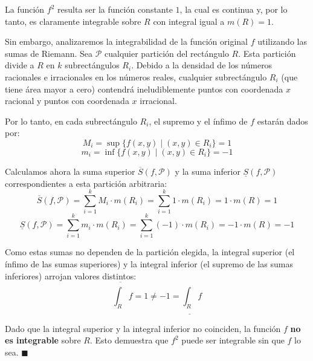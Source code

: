 \documentclass[11pt,letterpaper]{article}
\begin{document}
La función $f^2$ resulta ser la función constante $1$, la cual es continua y, por lo tanto, es claramente integrable sobre $R$ con integral igual a $m(R) = 1$. 

Sin embargo, analizaremos la integrabilidad de la función original $f$ utilizando las sumas de Riemann. Sea $\mathcal{P}$ cualquier partición del rectángulo $R$. Esta partición divide a $R$ en $k$ subrectángulos $R_i$. Debido a la densidad de los números racionales e irracionales en los números reales, cualquier subrectángulo $R_i$ (que tiene área mayor a cero) contendrá ineludiblemente puntos con coordenada $x$ racional y puntos con coordenada $x$ irracional. 

Por lo tanto, en cada subrectángulo $R_i$, el supremo y el ínfimo de $f$ estarán dados por:
\begin{equation*}
M_i = \sup \{ f(x,y) \mid (x,y) \in R_i \} = 1
\end{equation*}
\begin{equation*}
m_i = \inf \{ f(x,y) \mid (x,y) \in R_i \} = -1
\end{equation*}

Calculamos ahora la suma superior $\overline{S}(f, \mathcal{P})$ y la suma inferior $\underline{S}(f, \mathcal{P})$ correspondientes a esta partición arbitraria:
\begin{equation*}
\overline{S}(f, \mathcal{P}) = \sum_{i=1}^{k} M_i \cdot m(R_i) = \sum_{i=1}^{k} 1 \cdot m(R_i) = 1 \cdot m(R) = 1
\end{equation*}
\begin{equation*}
\underline{S}(f, \mathcal{P}) = \sum_{i=1}^{k} m_i \cdot m(R_i) = \sum_{i=1}^{k} (-1) \cdot m(R_i) = -1 \cdot m(R) = -1
\end{equation*}

Como estas sumas no dependen de la partición elegida, la integral superior (el ínfimo de las sumas superiores) y la integral inferior (el supremo de las sumas inferiores) arrojan valores distintos:
\begin{equation*}
\overline{\int_R} f = 1 \neq -1 = \underline{\int_R} f
\end{equation*}

Dado que la integral superior y la integral inferior no coinciden, la función $f$ \textbf{no es integrable} sobre $R$. Esto demuestra que $f^2$ puede ser integrable sin que $f$ lo sea. \hfill $\blacksquare$
\end{document}
